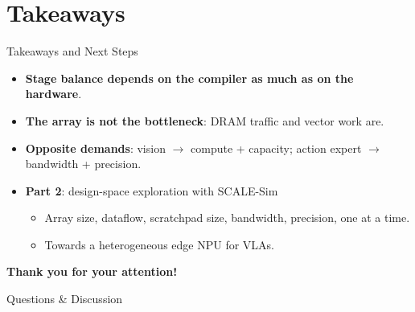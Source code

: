 \documentclass[light]{theme-beamer}
\begin{document}
\section{Takeaways}
\begin{frame}{Takeaways and Next Steps}
    \begin{itemize}
        \item \textbf{Stage balance depends on the compiler as much as on the hardware}.
        \item \textbf{The array is not the bottleneck}: DRAM traffic and vector work are.
        \item \textbf{Opposite demands}: vision $\to$ compute + capacity; action expert $\to$ bandwidth + precision.
        \vspace{0.8em}
        \item \textbf{Part 2}: design-space exploration with SCALE-Sim
        \begin{itemize}
            \item Array size, dataflow, scratchpad size, bandwidth, precision, one at a time.
            \item Towards a heterogeneous edge NPU for VLAs.
        \end{itemize}
    \end{itemize}
\end{frame}

\begin{frame}
    \vfill
    \begin{center}
        {\Huge \textbf{Thank you for your attention!}}

        \vspace{1.5em}

        {\Large Questions \& Discussion}
    \end{center}
    \vfill
\end{frame}
\end{document}
